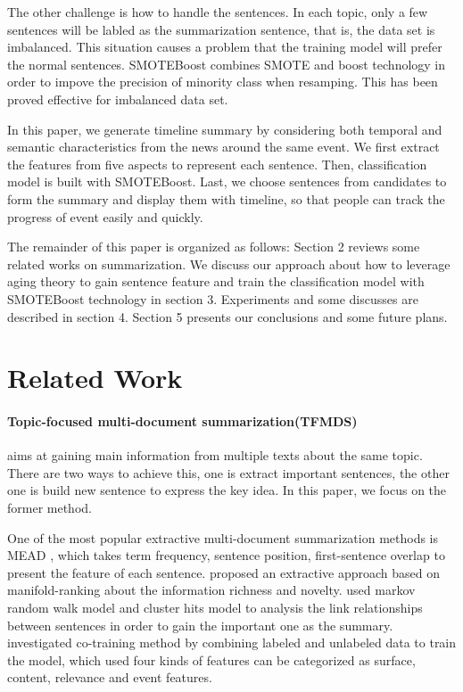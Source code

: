 \documentclass{llncs}
\begin{document}
The other challenge is how to handle the sentences. In each topic, only a few sentences will be labled as the summarization sentence, that is, the data set is imbalanced. This situation causes a problem that the training model will prefer the normal sentences. SMOTEBoost \cite{chawla2003smoteboost} combines SMOTE \cite{chawla2011smote} and boost technology in order to impove the precision of minority class when resamping. This has been proved effective for imbalanced data set. 

In this paper, we generate timeline summary by considering both temporal and semantic characteristics from the news around the same event. We first extract the features from five aspects to represent each sentence. Then, classification model is built with SMOTEBoost. Last, we choose sentences from candidates to form the summary and display them with timeline, so that people can track the progress of event easily and quickly.

The remainder of this paper is organized as follows: Section 2 reviews some related works on summarization. We discuss our approach about how to leverage aging theory to gain sentence feature and train the classification model with SMOTEBoost technology in section 3. Experiments and some discusses are described in section 4. Section 5 presents our conclusions and some future plans.


%
\section{Related Work}
%
\paragraph{Topic-focused multi-document summarization(TFMDS)} aims at gaining main information from multiple texts about the same topic. There are two ways to achieve this, one is extract important sentences, the other one is build new sentence to express the key idea. In this paper, we focus on the former method.

One of the most popular extractive multi-document summarization methods is MEAD \cite{2004-Radev-p919-938}, which takes term frequency, sentence position, first-sentence overlap to present the feature of each sentence. \cite{wan2007manifold} proposed an extractive approach based on manifold-ranking about the information richness and novelty. \cite{2008-Wan-p299-306} used markov random walk model and cluster hits model to analysis the link relationships between sentences in order to gain the important one as the summary. \cite{2008-Wong-p985-992} investigated co-training method by combining labeled and unlabeled data to train the model, which used four kinds of features can be categorized as surface, content, relevance and event features.
\end{document}
